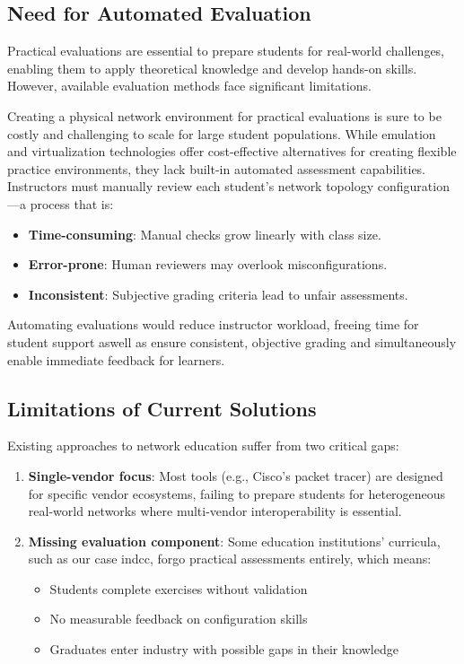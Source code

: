\subsection{Need for Automated Evaluation}

Practical evaluations are essential to prepare students for real-world challenges, enabling them to apply 
theoretical knowledge and develop hands-on skills. However, available evaluation methods face significant limitations.

Creating a physical network environment for practical evaluations is sure to be costly and challenging to scale for 
large student populations. 
While emulation and virtualization technologies offer cost-effective alternatives for creating flexible practice environments, 
they lack built-in automated assessment capabilities. 
Instructors must manually review each student's network topology configuration—a process that is:

\begin{itemize}
  \item \textbf{Time-consuming}: Manual checks grow linearly with class size.
  \item \textbf{Error-prone}: Human reviewers may overlook misconfigurations.
  \item \textbf{Inconsistent}: Subjective grading criteria lead to unfair assessments.
\end{itemize}

Automating evaluations would reduce instructor workload, freeing time for student support aswell as ensure consistent, objective grading 
and simultaneously enable immediate feedback for learners.

\subsection{Limitations of Current Solutions}

Existing approaches to network education suffer from two critical gaps:

\begin{enumerate}
    \item \textbf{Single-vendor focus}: Most tools (e.g., Cisco's packet tracer) are designed for specific vendor ecosystems, failing 
    to prepare students for heterogeneous real-world networks where multi-vendor interoperability is essential.
        \item \textbf{Missing evaluation component}: Some education institutions' curricula, such as our case in\ac{dcc}, forgo practical 
        assessments entirely, which means:
    \begin{itemize}
        \item Students complete exercises without validation
        \item No measurable feedback on configuration skills
        \item Graduates enter industry with possible gaps in their knowledge
    \end{itemize}
\end{enumerate}


